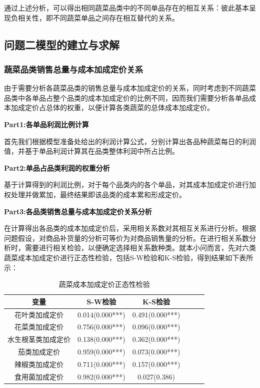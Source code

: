 \documentclass{my_paper}
\begin{document}
        通过上述分析，可以得出相同蔬菜品类中的不同单品存在的相互关系：彼此基本呈现负相关性，即不同蔬菜单品之间存在相互替代的关系。
\subsection{问题二模型的建立与求解}
\subsubsection{蔬菜品类销售总量与成本加成定价关系}
由于需要分析各蔬菜品类的销售总量与成本加成定价的关系，同时考虑到不同蔬菜品类中各单品占整个品类的成本加成定价的比例不同，因而我们需要分析各单品成本加成定价占总体的权重，以便计算各类蔬菜的总体成本加成定价。\par
\textbf{Part1:各单品利润比例计算}\par
首先我们根据模型准备处给出的利润计算公式，分别计算出各品种蔬菜每日的利润值，并基于单品利润计算其在品类整体利润中所占比例。\par
\vspace{0.5cm}
\textbf{Part2:单品占品类利润的权重分析}\par
基于计算得到的利润比例，对于每个品类内的各个单品，对其成本加成定价进行加权处理并做累加，最终结果即该品类的成本累和形成定价。\par
\vspace{0.5cm}
\textbf{Part3:各品类销售总量与成本加成定价关系分析}\par
在计算得出各品类的成本加成定价后，采用相关系数对其相互关系进行分析。根据问题假设，对商品补货量的分析可等价为对商品销售量的分析。在进行相关系数分析时，需要进行相关检验，以便确定选择相关系数种类。就本小问而言，先对六类蔬菜成本加成定价进行正态性检验，包括S-W检验和K-S检验，得到结果如下表所示：
\begin{table}[H]
    \centering
     \caption{蔬菜成本加成定价正态性检验}
    \begin{tabular}{cccccc}
    \toprule
        变量 & S-W检验  & K-S检验 \\ 
        \midrule
        花叶类加成定价 & 0.014(0.000***) & 0.491(0.000***) \\
        花菜类加成定价 & 0.756(0.000***) & 0.096(0.000***) \\
        水生根茎类加成定价 & 0.138(0.000***) & 0.362(0.000***) \\
        茄类加成定价 & 0.959(0.000***) & 0.073(0.000***) \\
        辣椒类加成定价 & 0.711(0.000***) & 0.157(0.000***) \\
        食用菌加成定价 & 0.982(0.000***) & 0.027(0.386) \\
        \bottomrule
    \end{tabular}
    \label{加成定价整体性检验}
\end{table}
\end{document}

